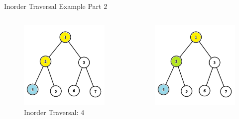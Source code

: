 \documentclass[aspectratio=169]{beamer}%
\begin{document}
\begin{frame}{Inorder Traversal Example Part 2}
    \begin{columns}
        \begin{column}{0.32\textwidth}
            \begin{figure}
                \centering
                \includegraphics[width = .9\linewidth]{tree-in 4.png}
                \caption{Inorder Traversal: 4}
            \end{figure}
        \end{column}
        \hfill
        \begin{column}{0.32\textwidth}
            \begin{figure}
                \centering
                \includegraphics[width = .9\linewidth]{tree-in 5.png}

\end{figure}
\end{column}
\end{columns}
\end{frame}
\end{document}
